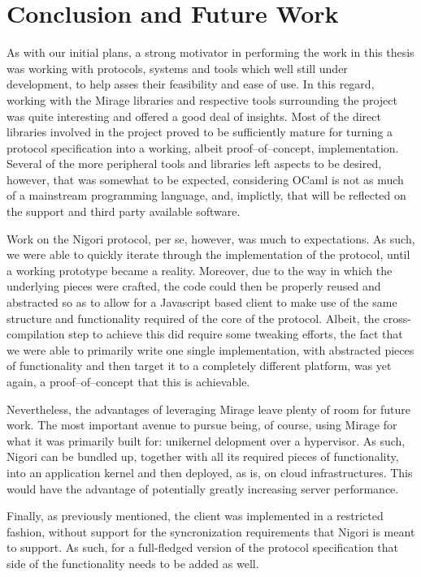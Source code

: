 \chapter{Conclusion and Future Work} \label{chapter:conclusion}
As with our initial plans, a strong motivator in performing the work in this thesis was working with protocols, systems and tools which well still under development, to help asses their feasibility and ease of use.
In this regard, working with the Mirage libraries and respective tools surrounding the project was quite interesting and offered a good deal of insights.
Most of the direct libraries involved in the project proved to be sufficiently mature for turning a protocol specification into a working, albeit proof--of--concept, implementation.
Several of the more peripheral tools and libraries left aspects to be desired, however, that was somewhat to be expected, considering OCaml is not as much of a mainstream programming language, and, implictly, that will be reflected on the support and third party available software.

Work on the Nigori protocol, per se, however, was much to expectations.
As such, we were able to quickly iterate through the implementation of the protocol, until a working prototype became a reality.
Moreover, due to the way in which the underlying pieces were crafted, the code could then be properly reused and abstracted so as to allow for a Javascript based client to make use of the same structure and functionality required of the core of the protocol.
Albeit, the cross-compilation step to achieve this did require some tweaking efforts, the fact that we were able to primarily write one single implementation, with abstracted pieces of functionality and then target it to a completely different platform, was yet again, a proof--of--concept that this is achievable.

Nevertheless, the advantages of leveraging Mirage leave plenty of room for future work.
The most important avenue to pursue being, of course, using Mirage for what it was primarily built for: unikernel delopment over a hypervisor.
As such, Nigori can be bundled up, together with all its required pieces of functionality, into an application kernel and then deployed, as is, on cloud infrastructures.
This would have the advantage of potentially greatly increasing server performance.

Finally, as previously mentioned, the client was implemented in a restricted fashion, without support for the syncronization requirements that Nigori is meant to support.
As such, for a full-fledged version of the protocol specification that side of the functionality needs to be added as well.
